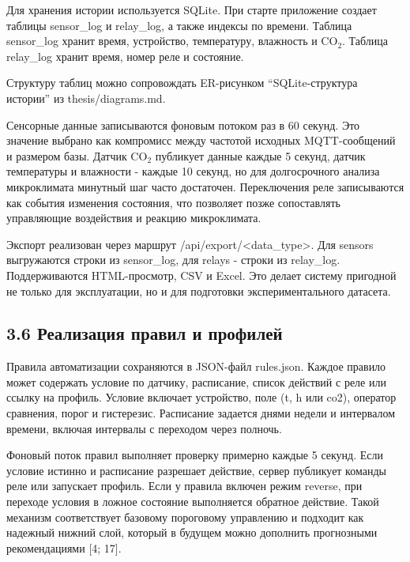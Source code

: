\documentclass[a4paper,14pt]{extarticle}
\renewcommand{\texttt}[1]{\textnormal{#1}}
\begin{document}
Для хранения истории используется SQLite. При старте приложение создает
таблицы \texttt{sensor\_log} и \texttt{relay\_log}, а также индексы по
времени. Таблица \texttt{sensor\_log} хранит время, устройство,
температуру, влажность и CO\(_2\). Таблица \texttt{relay\_log} хранит
время, номер реле и состояние.

Структуру таблиц можно сопровождать ER-рисунком ``SQLite-структура
истории'' из \texttt{thesis/diagrams.md}.

Сенсорные данные записываются фоновым потоком раз в 60 секунд. Это
значение выбрано как компромисс между частотой исходных MQTT-сообщений и
размером базы. Датчик CO\(_2\) публикует данные каждые 5 секунд, датчик
температуры и влажности - каждые 10 секунд, но для долгосрочного анализа
микроклимата минутный шаг часто достаточен. Переключения реле
записываются как события изменения состояния, что позволяет позже
сопоставлять управляющие воздействия и реакцию микроклимата.

Экспорт реализован через маршрут
\texttt{/api/export/\textless{}data\_type\textgreater{}}. Для
\texttt{sensors} выгружаются строки из \texttt{sensor\_log}, для
\texttt{relays} - строки из \texttt{relay\_log}. Поддерживаются
HTML-просмотр, CSV и Excel. Это делает систему пригодной не только для
эксплуатации, но и для подготовки экспериментального датасета.

\subsection{3.6 Реализация правил и
профилей}\label{ux440ux435ux430ux43bux438ux437ux430ux446ux438ux44f-ux43fux440ux430ux432ux438ux43b-ux438-ux43fux440ux43eux444ux438ux43bux435ux439}

Правила автоматизации сохраняются в JSON-файл \texttt{rules.json}.
Каждое правило может содержать условие по датчику, расписание, список
действий с реле или ссылку на профиль. Условие включает устройство, поле
(\texttt{t}, \texttt{h} или \texttt{co2}), оператор сравнения, порог и
гистерезис. Расписание задается днями недели и интервалом времени,
включая интервалы с переходом через полночь.

Фоновый поток правил выполняет проверку примерно каждые 5 секунд. Если
условие истинно и расписание разрешает действие, сервер публикует
команды реле или запускает профиль. Если у правила включен режим
\texttt{reverse}, при переходе условия в ложное состояние выполняется
обратное действие. Такой механизм соответствует базовому пороговому
управлению и подходит как надежный нижний слой, который в будущем можно
дополнить прогнозными рекомендациями {[}4; 17{]}.
\end{document}

